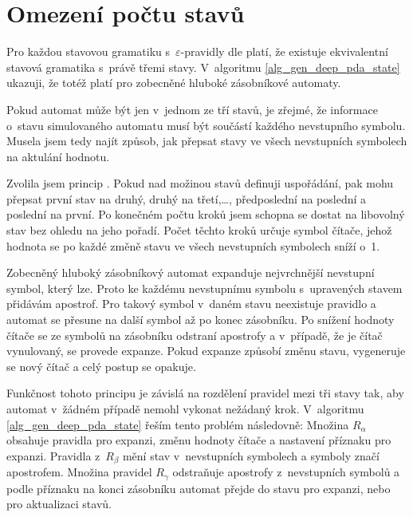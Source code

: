 \section{Omezení počtu stavů}

Pro každou stavovou gramatiku s~$\varepsilon$-pravidly dle \cite{Meduna:StateGrammars} platí, že existuje ekvivalentní stavová gramatika s~právě třemi stavy. V~algoritmu \ref{alg_gen_deep_pda_state} ukazuji, že totéž platí pro zobecněné hluboké zásobníkové automaty.

Pokud automat může být jen v~jednom ze tří stavů, je zřejmé, že informace o~stavu simulovaného automatu musí být součástí každého nevstupního symbolu. Musela jsem tedy najít způsob, jak přepsat stavy ve všech nevstupních symbolech na aktulání hodnotu. 

Zvolila jsem princip . Pokud nad možinou stavů definuji uspořádání, pak mohu přepsat první stav na druhý, druhý na třetí,\dots, předposlední na poslední a poslední na první. Po konečném počtu kroků jsem schopna se dostat na libovolný stav bez ohledu na jeho pořadí. Počet těchto kroků určuje symbol čítače, jehož hodnota se po každé změně stavu ve všech nevstupních symbolech sníží o~1. 

Zobecněný hluboký zásobníkový automat expanduje nejvrchnější nevstupní symbol, který lze. Proto ke každému nevstupnímu symbolu s~upravených stavem přidávám apostrof. Pro takový symbol v~daném stavu neexistuje pravidlo a automat se přesune na další symbol až po konec zásobníku. Po snížení hodnoty čítače se ze symbolů na zásobníku odstraní apostrofy a v~případě, že je čítač vynulovaný, se provede expanze. Pokud expanze způsobí změnu stavu, vygeneruje se nový čítač a celý postup se opakuje.

Funkčnost tohoto principu je závislá na rozdělení pravidel mezi tři stavy tak, aby automat v~žádném případě nemohl vykonat nežádaný krok. V~algoritmu \ref{alg_gen_deep_pda_state} řeším tento problém následovně: Množina $R_{\alpha}$ obsahuje pravidla pro expanzi, změnu hodnoty čítače a nastavení příznaku pro expanzi. Pravidla z~$R_{\beta}$ mění stav v~nevstupních symbolech a symboly značí apostrofem. Množina pravidel $R_{\gamma}$ odstraňuje apostrofy z~nevstupních symbolů a podle příznaku na konci zásobníku automat přejde do stavu pro expanzi, nebo pro aktualizaci stavů.

